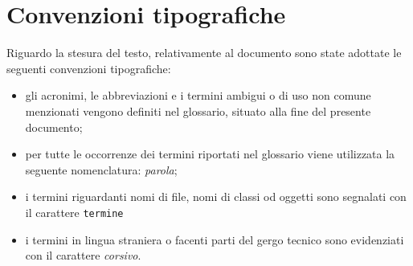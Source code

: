 \section{Convenzioni tipografiche}

Riguardo la stesura del testo, relativamente al documento sono state adottate le seguenti convenzioni tipografiche:
\begin{itemize}
	\item gli acronimi, le abbreviazioni e i termini ambigui o di uso non comune menzionati vengono definiti nel glossario, situato alla fine del presente documento;
	\item per tutte le occorrenze dei termini riportati nel glossario viene utilizzata la seguente nomenclatura: \emph{parola}\glsfirstoccur;
	\item i termini riguardanti nomi di file, nomi di classi od oggetti sono segnalati con il carattere \texttt{termine}
	\item i termini in lingua straniera o facenti parti del gergo tecnico sono evidenziati con il carattere \emph{corsivo}.
\end{itemize}